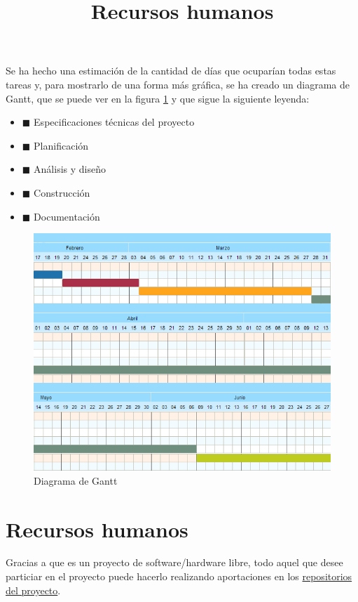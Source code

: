 Se ha hecho una estimación de la cantidad de días que ocuparían todas
estas tareas y, para mostrarlo de una forma más gráfica,
se ha creado un diagrama de Gantt, que se puede ver en la figura \ref{fig:gantt} y que sigue la siguiente leyenda:

\begin{itemize}
  \item  \textcolor{blueS}{$\blacksquare$} Especificaciones técnicas del proyecto
  \item  \textcolor{rojoOscuroS}{$\blacksquare$} Planificación
  \item  \textcolor{naranjaS}{$\blacksquare$} Análisis y diseño
  \item  \textcolor{verdeS}{$\blacksquare$} Construcción
  \item  \textcolor{pistachoS}{$\blacksquare$} Documentación
\end{itemize}



\begin{figure}[htb]
\centering
\includegraphics[width=1\textwidth]{./imagenes/gantt}
\caption{Diagrama de Gantt
} \label{fig:gantt}
\end{figure}


\title{Recursos humanos}
\section{Recursos humanos}

Gracias a que es un proyecto de software/hardware libre, todo aquel que
desee particiar en el proyecto puede hacerlo realizando aportaciones en los
\href{https://github.com/iblancasa/ArduBand}{repositorios del proyecto}.\\

